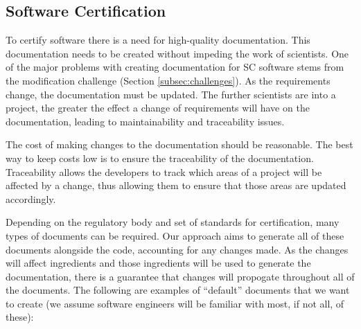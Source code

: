 \documentclass[10pt, preprint]{sigplanconf}
\begin{document}


\subsection{Software Certification} \label{subsec:software}

To certify software there is a need for high-quality
documentation. This documentation needs to be created without impeding the work
of scientists. One of the major problems with creating documentation for SC
software stems from the modification challenge (Section
\ref{subsec:challenges}). As the requirements change, the documentation must be
updated. The further scientists are into a project, the greater the effect a
change of requirements will have on the documentation, leading to
maintainability and traceability issues.

The cost of making changes to the documentation should be reasonable. The best
way to keep costs low is to ensure the traceability of the
documentation. Traceability allows the developers to track which areas of a
project will be affected by a change, thus allowing them to ensure that those
areas are updated accordingly.

Depending on the regulatory body and set of standards for certification, many
types of documents can be required. Our approach aims to generate all of these
documents alongside the code, accounting for any changes made. As the changes
will affect ingredients and those ingredients will be used to generate the
 documentation, there is a guarantee that changes will propogate throughout all
  of the documents. The following are examples of ``default'' documents that 
we want to create (we assume software engineers will be familiar with most, 
if not all, of these):
\end{document}
